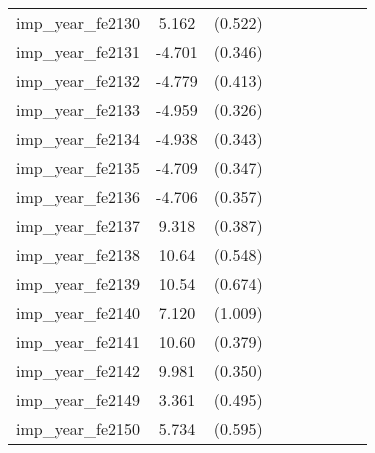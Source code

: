 {\begin{tabular}{l*{4}{cc}}
imp\_year\_fe2130&    5.162\sym{***}&  (0.522)&                  &         &                  &         &                  &         \\
imp\_year\_fe2131&   -4.701\sym{***}&  (0.346)&                  &         &                  &         &                  &         \\
imp\_year\_fe2132&   -4.779\sym{***}&  (0.413)&                  &         &                  &         &                  &         \\
imp\_year\_fe2133&   -4.959\sym{***}&  (0.326)&                  &         &                  &         &                  &         \\
imp\_year\_fe2134&   -4.938\sym{***}&  (0.343)&                  &         &                  &         &                  &         \\
imp\_year\_fe2135&   -4.709\sym{***}&  (0.347)&                  &         &                  &         &                  &         \\
imp\_year\_fe2136&   -4.706\sym{***}&  (0.357)&                  &         &                  &         &                  &         \\
imp\_year\_fe2137&    9.318\sym{***}&  (0.387)&                  &         &                  &         &                  &         \\
imp\_year\_fe2138&    10.64\sym{***}&  (0.548)&                  &         &                  &         &                  &         \\
imp\_year\_fe2139&    10.54\sym{***}&  (0.674)&                  &         &                  &         &                  &         \\
imp\_year\_fe2140&    7.120\sym{***}&  (1.009)&                  &         &                  &         &                  &         \\
imp\_year\_fe2141&    10.60\sym{***}&  (0.379)&                  &         &                  &         &                  &         \\
imp\_year\_fe2142&    9.981\sym{***}&  (0.350)&                  &         &                  &         &                  &         \\
imp\_year\_fe2149&    3.361\sym{***}&  (0.495)&                  &         &                  &         &                  &         \\
imp\_year\_fe2150&    5.734\sym{***}&  (0.595)&                  &         &                  &         &                  &         \\

\end{tabular}}
